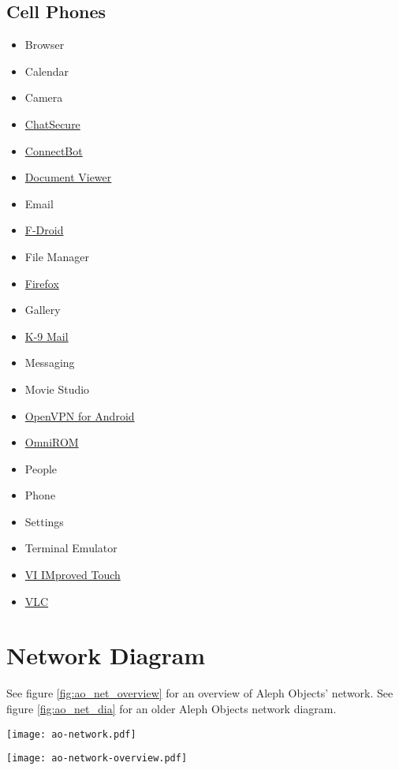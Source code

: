 \subsection{Cell Phones}
\begin{itemize}
\item Browser
\item Calendar
\item Camera
\item \href{https://chatsecure.org/}{ChatSecure}
\item \href{http://code.google.com/p/connectbot/}{ConnectBot}
\item \href{https://github.com/dschuermann/document-viewer}{Document Viewer}
\item Email
\item \href{https://f-droid.org/}{F-Droid}
\item File Manager
\item \href{http://www.mozilla.org/en-US/firefox/}{Firefox}
\item Gallery
\item \href{http://code.google.com/p/k9mail/}{K-9 Mail}
\item Messaging
\item Movie Studio
\item \href{https://code.google.com/p/ics-openvpn/}{OpenVPN for Android}
\item \href{https://omnirom.org/}{OmniROM}
\item People
\item Phone
\item Settings
\item Terminal Emulator
\item \href{https://github.com/momodalo/vimtouch}{VI IMproved Touch}
\item \href{http://www.videolan.org/vlc/download-android.html}{VLC}
\end{itemize}

\section{Network Diagram}
See figure \ref{fig:ao_net_overview} for an overview of Aleph Objects' network.
See figure \ref{fig:ao_net_dia} for an older Aleph Objects network diagram.

\begin{sidewaysfigure}[p]
\texttt{[image: ao-network.pdf]}
 \caption{Network Diagram}
 \label{fig:ao_net_dia}
\end{sidewaysfigure}

\begin{sidewaysfigure}[p]
\texttt{[image: ao-network-overview.pdf]}
 \caption{Aleph Objects Network Overview}
 \label{fig:ao_net_overview}
\end{sidewaysfigure}
